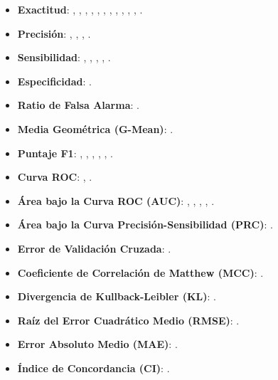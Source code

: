 \begin{itemize}
	\item \textbf{Exactitud}: \cite{pr_chen2013kickpredict}, \cite{pr_chen2015predcrowd}, \cite{pr_beckwith2016predcrowd}, \cite{pr_yuan2016textanalytics}, \cite{pr_sawhney2016usingLT}, \cite{pr_kaur2017socmedcrowd}, \cite{pr_kamath2018suplearn}, \cite{pr_yu2018deeplearning}, \cite{pr_lee2018contentDL}, \cite{pr_cheng2019deeplearning}, \cite{pr_chen2019keywords_crowdfunding}, \cite{pr_shafqat2019topicpredictions}.
	\item \textbf{Precisión}: \cite{pr_beckwith2016predcrowd}, \cite{pr_yuan2016textanalytics}, \cite{pr_kaur2017socmedcrowd}, \cite{pr_cheng2019deeplearning}.
	\item \textbf{Sensibilidad}: \cite{pr_beckwith2016predcrowd}, \cite{pr_yuan2016textanalytics}, \cite{pr_kaur2017socmedcrowd}, \cite{pr_cheng2019deeplearning}, \cite{pr_chen2019keywords_crowdfunding}.
	\item \textbf{Especificidad}: \cite{pr_chen2019keywords_crowdfunding}.
	\item \textbf{Ratio de Falsa Alarma}: \cite{pr_kaur2017socmedcrowd}.
	\item \textbf{Media Geométrica (G-Mean)}: \cite{pr_chen2019keywords_crowdfunding}.
	\item \textbf{Puntaje F1}: \cite{pr_zhou2015projectdesc}, \cite{pr_beckwith2016predcrowd}, \cite{pr_yuan2016textanalytics}, \cite{pr_kaur2017socmedcrowd}, \cite{pr_cheng2019deeplearning}, \cite{pr_chen2019keywords_crowdfunding}.
	\item \textbf{Curva ROC}: \cite{pr_zhou2015projectdesc}, \cite{pr_beckwith2016predcrowd}.
	\item \textbf{Área bajo la Curva ROC (AUC)}: \cite{pr_beckwith2016predcrowd}, \cite{pr_li2016predcrowd}, \cite{pr_kaur2017socmedcrowd}, \cite{pr_yu2018deeplearning}, \cite{pr_cheng2019deeplearning}.
	\item \textbf{Área bajo la Curva Precisión-Sensibilidad (PRC)}: \cite{pr_kaur2017socmedcrowd}.
	\item \textbf{Error de Validación Cruzada}: \cite{pr_mitra2014phrases}.
	\item \textbf{Coeficiente de Correlación de Matthew (MCC)}: \cite{pr_kaur2017socmedcrowd}.
	\item \textbf{Divergencia de Kullback-Leibler (KL)}: \cite{pr_jin2019dayssuccess}.
	\item \textbf{Raíz del Error Cuadrático Medio (RMSE)}: \cite{pr_jin2019dayssuccess}.
	\item \textbf{Error Absoluto Medio (MAE)}: \cite{pr_jin2019dayssuccess}.
	\item \textbf{Índice de Concordancia (CI)}: \cite{pr_jin2019dayssuccess}.
\end{itemize}

